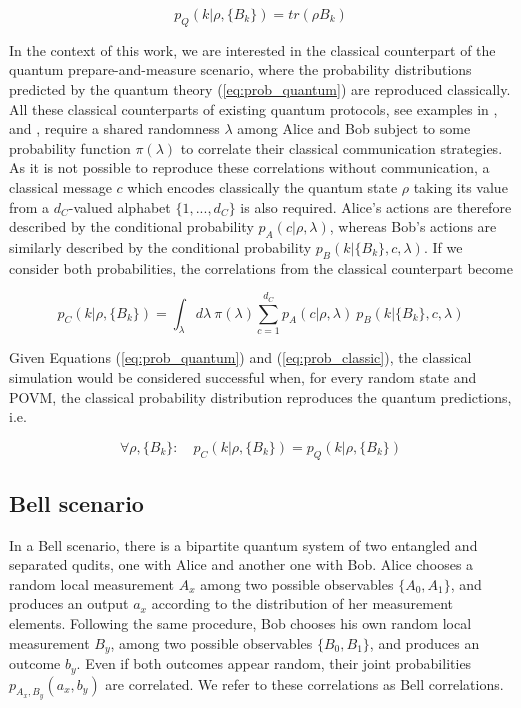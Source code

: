 \begin{equation}\label{eq:prob_quantum}
p_Q(k|\rho,\{B_{k}\}) = tr(\rho B_{k})
\end{equation}

In the context of this work, we are interested in the classical counterpart of the quantum prepare-and-measure scenario, where the probability distributions predicted by the quantum theory (\ref{eq:prob_quantum}) are reproduced classically. All these classical counterparts of existing quantum protocols, see examples in \cite{cerf2000}, \cite{toner2003} and \cite{renner2022}, require a shared randomness $\lambda$ among Alice and Bob subject to some probability function $\pi(\lambda)$ to correlate their classical communication strategies. As it is not possible to reproduce these correlations without communication, a classical message $c$ which encodes classically the quantum state $\rho$ taking its value from a $d_C$-valued alphabet $\{1,...,d_C\}$ is also required. Alice's actions are therefore described by the conditional probability $p_A(c|\rho,\lambda)$, whereas Bob's actions are similarly described by the conditional probability $p_B(k|\{B_{k}\},c,\lambda)$. If we consider both probabilities, the correlations from the classical counterpart become

\begin{equation}\label{eq:prob_classic}
p_C(k|\rho,\{B_{k}\}) = \int_{\lambda} d\lambda\ \pi(\lambda) \sum_{c=1}^{d_C} p_A(c|\rho, \lambda)\ p_B(k|\{B_{k}\}, c, \lambda)
\end{equation}

Given Equations (\ref{eq:prob_quantum}) and (\ref{eq:prob_classic}), the classical simulation would be considered successful when, for every random state and POVM, the classical probability distribution reproduces the quantum predictions, i.e.

\begin{equation}\label{eq:prob_classic_quantum}
\forall \rho, \{B_{k}\}:\quad p_C(k|\rho,\{B_{k}\}) = p_Q(k|\rho,\{B_{k}\})
\end{equation}

\subsection{Bell scenario}
In a Bell scenario, there is a bipartite quantum system of two entangled and separated qudits, one with Alice and another one with Bob. 
Alice chooses a random local measurement $A_x$ among two possible observables $\{A_0, A_1\}$, and produces an output $a_x$ according to the distribution of her measurement elements. Following the same procedure, Bob chooses his own random local measurement $B_y$, among two possible observables $\{B_0, B_1\}$, and produces an outcome $b_y$. Even if both outcomes appear random, their joint probabilities $p_{A_x,B_y}(a_x, b_y)$ are correlated. We refer to these correlations as Bell correlations. 

